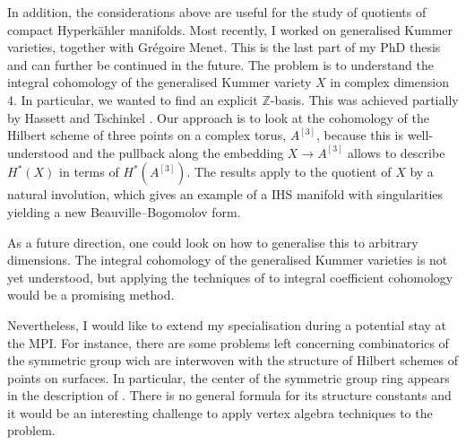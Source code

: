 \documentclass[11pt,a4paper,sans,english]{article}
\newcommand{\hilb}[1]{^{[#1]}}
\begin{document}
In addition, the considerations above are useful for the study of quotients of compact Hyperk\"ahler manifolds. Most recently, I worked on generalised Kummer varieties, together with Gr\'egoire Menet. This is the last part of my PhD thesis and can further be continued in the future. The problem is to understand the integral cohomology of the generalised Kummer variety $X$ in complex dimension 4. In particular, we wanted to find an explicit $\mathbb{Z}$-basis. This was achieved partially by Hassett and Tschinkel \cite{HassettTschinkel}. Our approach is to look at the cohomology of the Hilbert scheme of three points on a complex torus, $A\hilb{3}$, because this is well-understood and the pullback along the embedding $X\longrightarrow A\hilb{3}$ allows to describe $H^*(X)$ in terms of $H^*(A\hilb{3})$. The results apply to the quotient of $X$ by a natural involution, which gives an example of a IHS manifold with singularities yielding a new Beauville--Bogomolov form. 

As a future direction, one could look on how to generalise this to arbitrary dimensions. The integral cohomology of the generalised Kummer varieties is not yet understood, but applying the techniques of \cite{NTwist} to integral coefficient cohomology would be a promising method. 

Nevertheless, I would like to extend my specialisation during a potential stay at the MPI. For instance, there are some problems left concerning combinatorics of the symmetric group wich are interwoven with the structure of Hilbert schemes of points on surfaces. In particular, the center of the symmetric group ring appears in the description of \cite{LehnSorger}. There is no general formula for its structure constants and it would be an interesting challenge to apply vertex algebra techniques to the problem.
\end{document}
